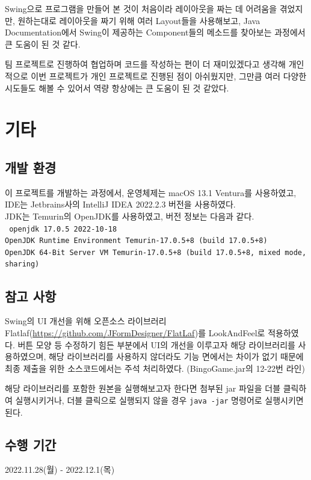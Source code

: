 Swing으로 프로그램을 만들어 본 것이 처음이라 레이아웃을 짜는 데 어려움을 겪었지만,
원하는대로 레이아웃을 짜기 위해 여러 Layout들을 사용해보고, Java Documentation에서 Swing이 제공하는 Component들의 메소드를 찾아보는 과정에서 큰 도움이 된 것 같다.

팀 프로젝트로 진행하여 협업하며 코드를 작성하는 편이 더 재미있겠다고 생각해 개인적으로 이번 프로젝트가 개인 프로젝트로 진행된 점이 아쉬웠지만,
그만큼 여러 다양한 시도들도 해볼 수 있어서 역량 항상에는 큰 도움이 된 것 같았다.

\section{기타}
\subsection{개발 환경}
이 프로젝트를 개발하는 과정에서, 운영체제는 macOS 13.1 Ventura를 사용하였고, IDE는 Jetbrains사의 IntelliJ IDEA 2022.2.3 버전을 사용하였다.\\
JDK는 Temurin의 OpenJDK를 사용하였고, 버전 정보는 다음과 같다.\\
\texttt{
    openjdk 17.0.5 2022-10-18\\
    OpenJDK Runtime Environment Temurin-17.0.5+8 (build 17.0.5+8)\\
    OpenJDK 64-Bit Server VM Temurin-17.0.5+8 (build 17.0.5+8, mixed mode, sharing)
}

\subsection{참고 사항}
Swing의 UI 개선을 위해 오픈소스 라이브러리 Flatlaf(\url{https://github.com/JFormDesigner/FlatLaf})를 LookAndFeel로 적용하였다.
버튼 모양 등 수정하기 힘든 부분에서 UI의 개선을 이루고자 해당 라이브러리를 사용하였으며, 해당 라이브러리를 사용하지 않더라도 기능 면에서는 차이가 없기 때문에 최종 제출을 위한 소스코드에서는 주석 처리하였다. (BingoGame.jar의 12-22번 라인)

해당 라이브러리를 포함한 원본을 실행해보고자 한다면 첨부된 jar 파일을 더블 클릭하여 실행시키거나, 더블 클릭으로 실행되지 않을 경우 \texttt{java -jar} 명령어로 실행시키면 된다.

\subsection{수행 기간}
2022.11.28(월) - 2022.12.1(목)


